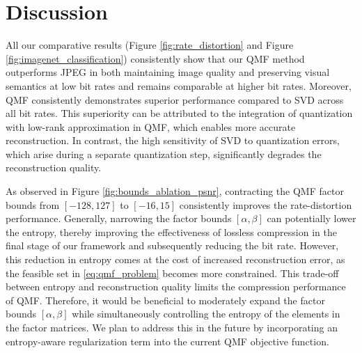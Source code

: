 \section{Discussion} \label{sec:discussion}

All our comparative results (Figure \ref{fig:rate_distortion} and Figure \ref{fig:imagenet_classification}) consistently show that our QMF method outperforms JPEG in both maintaining image quality and preserving visual semantics at low bit rates and remains comparable at higher bit rates. Moreover, QMF consistently demonstrates superior performance compared to SVD across all bit rates. This superiority can be attributed to the integration of quantization with low-rank approximation in QMF, which enables more accurate reconstruction. In contrast, the high sensitivity of SVD to quantization errors, which arise during a separate quantization step, significantly degrades the reconstruction quality.


As observed in Figure \ref{fig:bounds_ablation_psnr}, contracting the QMF factor bounds from $[-128, 127]$ to $[-16, 15]$ consistently improves the rate-distortion performance. Generally, narrowing the factor bounds $[\alpha, \beta]$ can potentially lower the entropy, thereby improving the effectiveness of lossless compression in the final stage of our framework and subsequently reducing the bit rate. However, this reduction in entropy comes at the cost of increased reconstruction error, as the feasible set in \eqref{eq:qmf_problem} becomes more constrained. This trade-off between entropy and reconstruction quality limits the compression performance of QMF. Therefore, it would be beneficial to moderately expand the factor bounds $[\alpha, \beta]$ while simultaneously controlling the entropy of the elements in the factor matrices. We plan to address this in the future by incorporating an entropy-aware regularization term into the current QMF objective function.

